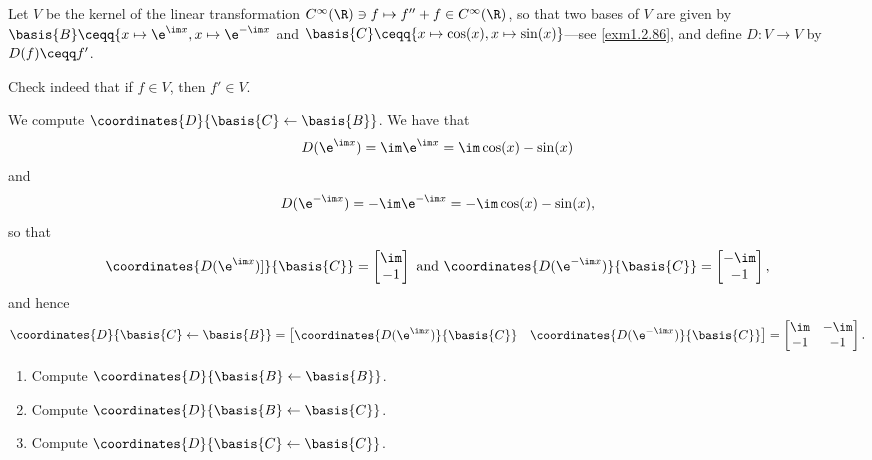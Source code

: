\begin{exm}{}{}
	Let $V$ be the kernel of the linear transformation $C^{\infty}(\R )\ni f\mapsto f''+f\in C^{\infty}(\R )$, so that two bases of $V$ are given by $\basis{B}\ceqq \{ x\mapsto \e ^{\im x},x\mapsto \e ^{-\im x}$ and $\basis{C}\ceqq \{ x\mapsto \cos (x),x\mapsto \sin (x)\}$---see \cref{exm1.2.86}, and define $D\colon V\rightarrow V$ by $D(f)\ceqq f'$.
	\begin{exr}[breakable=false]{}{}
		Check indeed that if $f\in V$, then $f'\in V$.
	\end{exr}
	
	We compute $\coordinates{D}{\basis{C}\leftarrow \basis{B}}$.  We have that
	\begin{equation}
		D(\e ^{\im x})=\im \e ^{\im x}=\im \cos (x)-\sin (x)
	\end{equation}
	and
	\begin{equation}
		D(\e ^{-\im x})=-\im \e ^{-\im x}=-\im \cos (x)-\sin (x),
	\end{equation}
	so that
	\begin{equation}
		\coordinates{D(\e ^{\im x})]}{\basis{C}}=\begin{bmatrix}\im \\ -1\end{bmatrix}\text{ and }\coordinates{D(\e ^{-\im x})}{\basis{C}}=\begin{bmatrix}-\im \\ -1\end{bmatrix},
	\end{equation}
	and hence
	\begin{equation}
		\coordinates{D}{\basis{C}\leftarrow \basis{B}}=\begin{bmatrix}\coordinates{D(\e ^{\im x})}{\basis{C}} & \coordinates{D(\e ^{-\im x})}{\basis{C}}\end{bmatrix}=\begin{bmatrix}\im & -\im \\ -1 & -1\end{bmatrix}.
	\end{equation}
	
	\begin{exr}[breakable=false]{}{}
		\begin{enumerate}
			\item Compute $\coordinates{D}{\basis{B}\leftarrow \basis{B}}$.
			\item Compute $\coordinates{D}{\basis{B}\leftarrow \basis{C}}$.
			\item Compute $\coordinates{D}{\basis{C}\leftarrow \basis{C}}$.
		\end{enumerate}
	\end{exr}
\end{exm}
